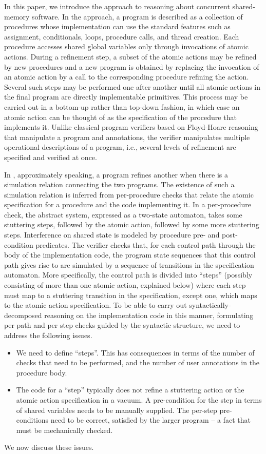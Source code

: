 In this paper, we introduce the \civl approach to reasoning about concurrent shared-memory software.
In the \civl approach, a program is described as a collection of procedures whose implementation 
can use the standard features such as assignment, conditionals, loops, procedure calls, and thread creation. 
Each procedure accesses shared global variables only through invocations of atomic actions.
During a refinement step, a subset of the atomic actions may be refined by new procedures and a new program is 
obtained by replacing the invocation of an atomic action by a call to the corresponding procedure refining the action.
Several such steps may be performed one after another until all atomic actions in the final program are directly implementable primitives.
This process may be carried out in a bottom-up rather than top-down fashion, in which case an atomic action 
can be thought of as the specification of the procedure that implements it.
Unlike classical program verifiers based on Floyd-Hoare reasoning that manipulate a program and annotations, 
the \civl verifier manipulates multiple operational descriptions of a program, i.e., several levels of refinement are specified and verified at once. 

In \civl, approximately speaking, a program refines another when there is a simulation relation connecting the two programs. 
The existence of such a simulation relation is inferred from per-procedure checks that relate the atomic specification for a procedure and the code implementing it. 
In a per-procedure check, the abstract system, expressed as a two-state automaton, takes some stuttering steps, followed by the atomic action, followed by some more stuttering steps. 
Interference on shared state is modeled by procedure pre- and post-condition predicates.
The verifier checks that, for each control path through the body of the implementation code, the program state sequences that this control path gives rise to are simulated by a sequence of transitions in the specification automaton. 
More specifically, the control path is divided into ``steps'' (possibly consisting of more than one atomic action, explained below) where each step must map to a stuttering transition in the specification, except one, which maps to the atomic action specification.
To be able to carry out syntactically-decomposed reasoning on the implementation code in this manner, formulating per path and per step checks guided by the syntactic structure, we need to address the following issues. 
\begin{itemize}
\item We need to define ``steps''. This has consequences in terms of the number of checks that need to be performed, and the number of user annotations in the procedure body.
\item The code for a ``step'' typically does not refine a stuttering action or the atomic action specification in a vacuum. A pre-condition for the step in terms of shared variables needs to be manually supplied. The per-step pre-conditions need to be correct, satisfied by the larger program -- a fact that must be mechanically checked. 
\end{itemize}
We now discuss these issues. 

